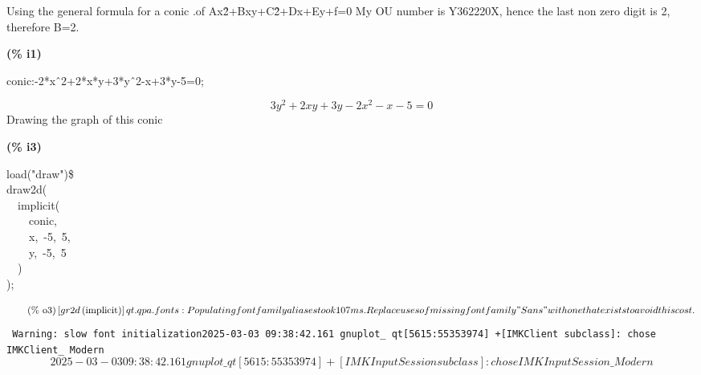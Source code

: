\documentclass[fleqn]{article}
\begin{document}
Using the general formula for a  conic .of Ax\^ 2+Bxy+C\^ 2+Dx+Ey+f=0 My OU number is Y362220X, hence the last non zero digit is 2, therefore B=2.


\noindent
\begin{minipage}[t]{4.000000em}\color{red}\bfseries
(\% i1)	
\end{minipage}
\begin{minipage}[t]{\textwidth}\color{blue}
conic:-2*x\^\ 2+2*x*y+3*y\^\ 2-x+3*y-5=0;
\end{minipage}
\[\displaystyle \tag{conic} 
3 {{y}^{2}}\mathop{+}2 x y\mathop{+}3 y\mathop{-}2 {{x}^{2}}\mathop{-}x\mathop{-}5\mathop{=}0\mbox{}
\]
Drawing the graph of this conic


\noindent
\begin{minipage}[t]{4.000000em}\color{red}\bfseries
(\% i3)	
\end{minipage}
\begin{minipage}[t]{\textwidth}\color{blue}
load("draw")\$\\
draw2d(\\
\ \ implicit(\\
\ \ \ \ conic,\\
\ \ \ \ x,\ -5,\ 5,\\
\ \ \ \ y,\ -5,\ 5\\
\ \ )\\
);
\end{minipage}
\[\displaystyle \tag{\% o3} 
\left[ \mathop{gr2d}\left( \ensuremath{\mathrm{implicit}}\right) \right] qt.qpa.fonts: Populating font family aliases took 107 ms. Replace uses of missing font family "Sans" with one that exists to avoid this cost. 
\] \texttt{%
Warning: slow font initialization2025-03-03 09:38:42.161 gnuplot\_ qt[5615:55353974] +[IMKClient subclass]: chose IMKClient\_ Modern
}\[2025-03-03 09:38:42.161 gnuplot\_ qt[5615:55353974] +[IMKInputSession subclass]: chose IMKInputSession\_ Modern\mbox{}
\]
\end{document}

